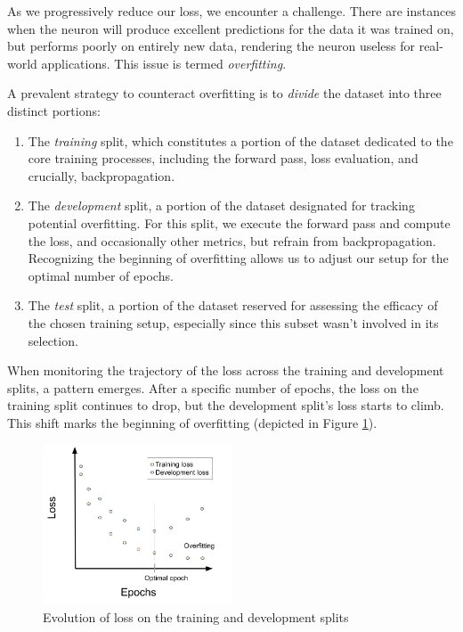 \label{02_nn_overfitting}


As we progressively reduce our loss, we encounter a challenge. There are instances when the neuron will produce excellent predictions for the data it was trained on, but performs poorly on entirely new data, rendering the neuron useless for real-world applications. This issue is termed \emph{overfitting}.

A prevalent strategy to counteract overfitting is to \emph{divide} the dataset into three distinct portions:

\begin{enumerate}
\item The \emph{training} split, which constitutes a portion of the dataset dedicated to the core training processes, including the forward pass, loss evaluation, and crucially, backpropagation.
\item The \emph{development} split, a portion of the dataset designated for tracking potential overfitting. For this split, we execute the forward pass and compute the loss, and occasionally other metrics, but refrain from backpropagation. Recognizing the beginning of overfitting allows us to adjust our setup for the optimal number of epochs.
\item The \emph{test} split, a portion of the dataset reserved for assessing the efficacy of the chosen training setup, especially since this subset wasn't involved in its selection.
\end{enumerate}

When monitoring the trajectory of the loss across the training and development splits, a pattern emerges. After a specific number of epochs, the loss on the training split continues to drop, but the development split's loss starts to climb. This shift marks the beginning of overfitting (depicted in Figure \ref{fig:02_nn_split_loss_evolution}).

\begin{figure}
    \centering
    \includegraphics[width=0.5\textwidth]{Figures/02/02_split_loss_evolution.png}
    \caption{Evolution of loss on the training and development splits}
    \label{fig:02_nn_split_loss_evolution}
\end{figure}

